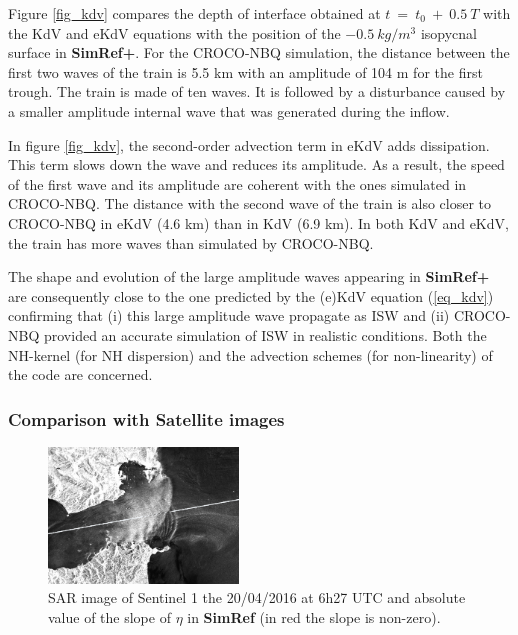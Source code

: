\documentclass[a4paper,12pt]{article}
\begin{document}
Figure \ref{fig_kdv} compares the depth of interface obtained at $t\ =\ t_0\ +\ 0.5\ T$ with the KdV and eKdV equations with the position of the $-0.5\ kg/m^3$ isopycnal surface in \textbf{SimRef+}. For the CROCO-NBQ simulation, the distance between the first two waves of the train is 5.5 km with an amplitude of 104 m for the first trough. The train is made of ten waves. It is followed by a disturbance caused by a smaller amplitude internal wave that was generated during the inflow.

In figure \ref{fig_kdv}, the second-order advection term in eKdV adds dissipation. This term slows down the wave and reduces its amplitude. As a result, the speed of the first wave and its amplitude are coherent with the ones simulated in CROCO-NBQ. The distance with the second wave of the train is also closer to CROCO-NBQ in eKdV (4.6 km) than in KdV (6.9 km). In both KdV and eKdV, the train has more waves than simulated by CROCO-NBQ.

The shape and evolution of the large amplitude waves appearing in \textbf{SimRef+} are consequently close to the one predicted by the (e)KdV equation (\ref{eq_kdv}) confirming that (i) this large amplitude wave propagate as ISW and (ii) CROCO-NBQ provided an accurate simulation of ISW in realistic conditions. Both the NH-kernel (for NH dispersion) and the advection schemes (for non-linearity) of the code are concerned.\\


\subsubsection{Comparison with Satellite images}
\begin{figure}[!h]
 \centering
 \includegraphics[width=0.45\textwidth]{sat_2dref_20042016_zoom.png}
 \caption{SAR image of Sentinel 1 the 20/04/2016 at 6h27 UTC and absolute value of the slope of $\eta$ in \textbf{SimRef} (in red the slope is non-zero). }
 \label{sat2d}
\end{figure}
\end{document}
